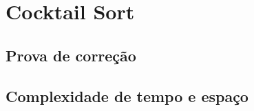 \section{Cocktail Sort}
\lipsum[19]



\subsection{Prova de correção}
\lipsum[19]

\subsection{Complexidade de tempo e espaço}
\lipsum[19]